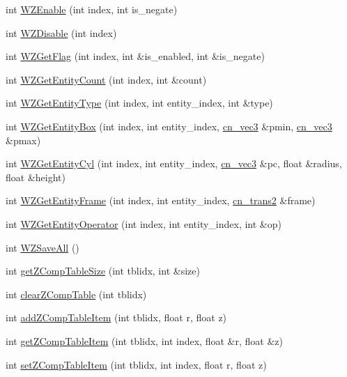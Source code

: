 \begin{DoxyCompactItemize}
int \hyperlink{classCUIApp_a9431ce97ebd52d159463c139c9dae083}{W\-Z\-Enable} (int index, int is\-\_\-negate)
\item 
int \hyperlink{classCUIApp_a2183043cadcc4afbebbd6afc10e57313}{W\-Z\-Disable} (int index)
\item 
int \hyperlink{classCUIApp_adc50b08e02682b5e3f1e002d31040e4c}{W\-Z\-Get\-Flag} (int index, int \&is\-\_\-enabled, int \&is\-\_\-negate)
\item 
int \hyperlink{classCUIApp_addb92c34a41a38e8688ec8c16da6396a}{W\-Z\-Get\-Entity\-Count} (int index, int \&count)
\item 
int \hyperlink{classCUIApp_aeb65cce62258e48239d713554e062794}{W\-Z\-Get\-Entity\-Type} (int index, int entity\-\_\-index, int \&type)
\item 
int \hyperlink{classCUIApp_a716eda397e3bec88da602c18b0e91556}{W\-Z\-Get\-Entity\-Box} (int index, int entity\-\_\-index, \hyperlink{structcn__vec3}{cn\-\_\-vec3} \&pmin, \hyperlink{structcn__vec3}{cn\-\_\-vec3} \&pmax)
\item 
int \hyperlink{classCUIApp_a72a74c0cbd2242374cf69b53a9c03e36}{W\-Z\-Get\-Entity\-Cyl} (int index, int entity\-\_\-index, \hyperlink{structcn__vec3}{cn\-\_\-vec3} \&pc, float \&radius, float \&height)
\item 
int \hyperlink{classCUIApp_a4e3483222d1296c96d04e46e28b03715}{W\-Z\-Get\-Entity\-Frame} (int index, int entity\-\_\-index, \hyperlink{structcn__trans2}{cn\-\_\-trans2} \&frame)
\item 
int \hyperlink{classCUIApp_ab90f33b53859cf92935b2e8b4618d747}{W\-Z\-Get\-Entity\-Operator} (int index, int entity\-\_\-index, int \&op)
\item 
int \hyperlink{classCUIApp_aacac360f0c6dd5a21ddc672a7ae8c52b}{W\-Z\-Save\-All} ()
\item 
int \hyperlink{classCUIApp_a2b36c2c000c8ac40267a32e5588874b9}{get\-Z\-Comp\-Table\-Size} (int tblidx, int \&size)
\item 
int \hyperlink{classCUIApp_a9c2d0d375c5ebfdd37bf8eb8c070248e}{clear\-Z\-Comp\-Table} (int tblidx)
\item 
int \hyperlink{classCUIApp_a4f1db639671b867b5d77821a2a9bbf59}{add\-Z\-Comp\-Table\-Item} (int tblidx, float r, float z)
\item 
int \hyperlink{classCUIApp_ab5aba87f4504310bacaa9472d86749f6}{get\-Z\-Comp\-Table\-Item} (int tblidx, int index, float \&r, float \&z)
\item 
int \hyperlink{classCUIApp_a421e0358fe93ca66e0f7a74f6c4075b2}{set\-Z\-Comp\-Table\-Item} (int tblidx, int index, float r, float z)

\end{DoxyCompactItemize}
